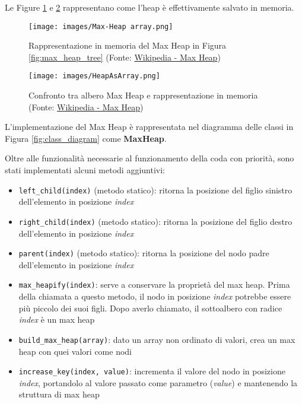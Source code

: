 \documentclass{article}
\begin{document}
Le Figure \ref{fig:max_heap_list} e \ref{fig:max_heap_representation} rappresentano come l'heap è effettivamente salvato in memoria.

\begin{figure}[h]
    \texttt{[image: images/Max-Heap array.png]}
    \centering
    \caption{Rappresentazione in memoria del Max Heap in Figura \ref{fig:max_heap_tree} (Fonte: \href{https://en.wikipedia.org/wiki/Heap_(data_structure)}{Wikipedia - Max Heap})}
    \label{fig:max_heap_list}
\end{figure}

\begin{figure}[h]
    \texttt{[image: images/HeapAsArray.png]}
    \centering
    \caption{Confronto tra albero Max Heap e rappresentazione in memoria (Fonte: \href{https://en.wikipedia.org/wiki/Heap_(data_structure)}{Wikipedia - Max Heap})}
    \label{fig:max_heap_representation}
\end{figure}

L'implementazione del Max Heap è rappresentata nel diagramma delle classi in Figura \ref{fig:class_diagram} come \textbf{MaxHeap}.

\vspace{5pt}
Oltre alle funzionalità necessarie al funzionamento della coda con priorità, sono stati implementati alcuni metodi aggiuntivi:

\begin{itemize}
    \item \verb|left_child(index)| (metodo statico): ritorna la posizione del figlio sinistro dell'elemento in posizione \emph{index}
    
    \item \verb|right_child(index)| (metodo statico): ritorna la posizione del figlio destro dell'elemento in posizione \emph{index}
    
    \item \verb|parent(index)| (metodo statico): ritorna la posizione del nodo padre dell'elemento in posizione \emph{index}
    
    \item \verb|max_heapify(index)|: serve a conservare la proprietà del max heap. Prima della chiamata a questo metodo, il nodo in posizione \emph{index} potrebbe essere più piccolo dei suoi figli. Dopo averlo chiamato, il sottoalbero con radice \emph{index} è un max heap

    \item \verb|build_max_heap(array)|: dato un array non ordinato di valori, crea un max heap con quei valori come nodi

    \item \verb|increase_key(index, value)|: incrementa il valore del nodo in posizione \emph{index}, portandolo al valore passato come parametro (\emph{value}) e mantenendo la struttura di max heap
\end{itemize}
\end{document}
